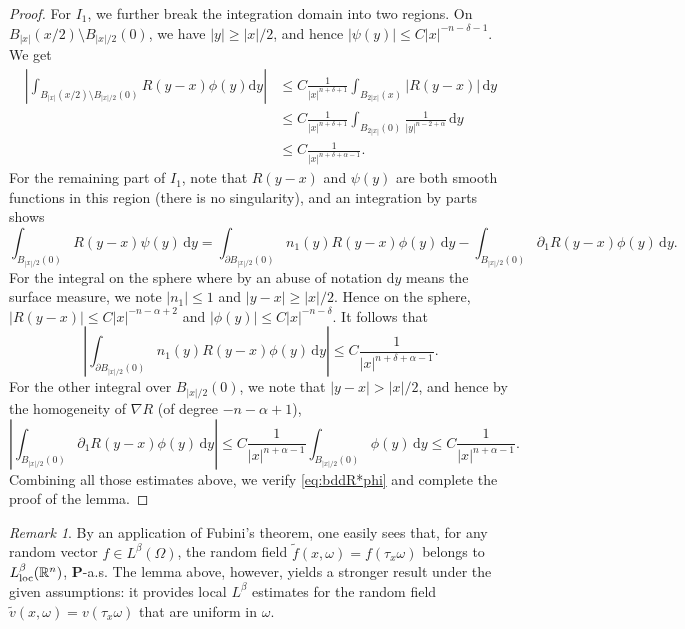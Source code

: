 \documentclass[11pt,reqno]{amsart}
\theoremstyle{definition}
\theoremstyle{remark}
\newtheorem{rem}{Remark}[section]
\numberwithin{equation}{section}
\newcommand{\R}{{\mathbb{R}}}
\newcommand{\dd}{\mathrm{d}}
\begin{document}
\begin{proof}
For $I_1$, we further break the integration domain into two regions. On $B_{|x|}(x/2)\setminus B_{|x|/2}(0)$, we have $|y|\ge |x|/2$, and hence $|\psi(y)|\le C|x|^{-n-\delta-1}$. We get
\begin{equation*}
\begin{aligned}
    \left| \int_{B_{|x|}(x/2)\setminus B_{|x|/2}(0)} R(y-x)\phi(y) \dd y\right| &\le C\frac{1}{|x|^{n+\delta+1}} \int_{B_{2|x|}(x)} |R(y-x)|\,\dd y\\
    &\le C\frac{1}{|x|^{n+\delta+1}} \int_{B_{2|x|}(0)} \frac{1}{|y|^{n-2+\alpha}}\,\dd y\\
    &\le C\frac{1}{|x|^{n+\delta+\alpha-1}}.
    \end{aligned}
\end{equation*}
For the remaining part of $I_1$, note that $R(y-x)$ and $\psi(y)$ are both smooth functions in this region (there is no singularity), and an integration by parts shows
\begin{equation*}
    \int_{B_{|x|/2}(0)} R(y-x)\psi(y)\,\dd y = \int_{\partial B_{|x|/2}(0)} n_1(y)R(y-x)\phi(y)\,\dd y - \int_{B_{|x|/2}(0)} \partial_1 R(y-x)\phi(y)\,\dd y.
\end{equation*}
For the integral on the sphere where by an abuse of notation $\dd y$ means the surface measure, we note $|n_1|\le 1$ and $|y-x|\ge |x|/2$. Hence on the sphere, $|R(y-x)|\le C|x|^{-n-\alpha+2}$ and $|\phi(y)|\le C|x|^{-n-\delta}$. It follows that
\begin{equation*}
    \left|\int_{\partial B_{|x|/2}(0)} n_1(y)R(y-x)\phi(y)\,\dd y\right| \le C\frac{1}{|x|^{n+\delta+\alpha-1}}.
\end{equation*}
For the other integral over $B_{|x|/2}(0)$, we note that $|y-x|>|x|/2$, and hence by the homogeneity of $\nabla R$ (of degree $-n-\alpha+1$), 
\begin{equation*}
    \left|\int_{B_{|x|/2}(0)} \partial_1 R(y-x)\phi(y)\,\dd y\right| \le C\frac{1}{|x|^{n+\alpha-1}} \int_{B_{|x|/2}(0)} \phi(y)\,\dd y \le C\frac{1}{|x|^{n+\alpha-1}}.
\end{equation*}
Combining all those estimates above, we verify \eqref{eq:bddR*phi} and complete the proof of the lemma.
\end{proof}

\begin{rem} By an application of Fubini's theorem, one easily sees that, for any random vector $f\in L^\beta(\Omega)$, the random field $\widetilde f(x,\omega) = f(\tau_x \omega)$ belongs to $L^\beta_{\rm loc}(\R^n)$, $\mathbf{P}$-a.s. The lemma above, however, yields a stronger result under the given assumptions: it provides local $L^\beta$ estimates for the random field $\widetilde v(x,\omega) = v(\tau_x \omega)$ that are uniform in $\omega$. 
\end{rem}
\end{document}
